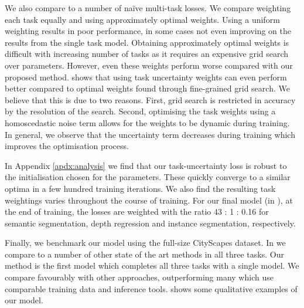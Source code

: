We also compare to a number of na{\"i}ve multi-task losses. We compare weighting each task equally and using approximately optimal weights. Using a uniform weighting results in poor performance, in some cases not even improving on the results from the single task model. Obtaining approximately optimal weights is difficult with increasing number of tasks as it requires an expensive grid search over parameters. However, even these weights perform worse compared with our proposed method.  shows that using task uncertainty weights can even perform better compared to optimal weights found through fine-grained grid search. We believe that this is due to two reasons. First, grid search is restricted in accuracy by the resolution of the search. Second, optimising the task weights using a homoscedastic noise term allows for the weights to be dynamic during training. In general, we observe that the uncertainty term decreases during training which improves the optimisation process.

In Appendix \ref{apdx:analysis} we find that our task-uncertainty loss is robust to the initialisation chosen for the parameters. These quickly converge to a similar optima in a few hundred training iterations. We also find the resulting task weightings varies throughout the course of training. For our final model (in ), at the end of training, the losses are weighted with the ratio 43 : 1 : 0.16 for semantic segmentation, depth regression and instance segmentation, respectively.

Finally, we benchmark our model using the full-size CityScapes dataset. In  we compare to a number of other state of the art methods in all three tasks. Our method is the first model which completes all three tasks with a single model. We compare favourably with other approaches, outperforming many which use comparable training data and inference tools.  shows some qualitative examples of our model.



